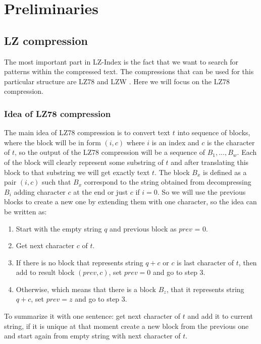 \section{Preliminaries}
\subsection{LZ compression}
\label{subsection:LZCompression}
The most important part in LZ-Index \cite{LZIndex} is the fact that we want to search for patterns within the compressed text. The compressions that can be used for this particular structure are LZ78 \cite{LZ78} and LZW \cite{LZW}. Here we will focus on the LZ78 compression. 

\subsubsection{Idea of LZ78 compression}

The main idea of LZ78 compression is to convert text $t$ into sequence of blocks, where the block will be in form $(i, c)$ where $i$ is an index and $c$ is the character of $t$, so the output of the LZ78 compression will be a sequence of $B_1,...,B_w$. Each of the block will clearly represent some substring of $t$ and after translating this block to that substring we will get exactly text $t$. The  block $B_x$ is defined as a pair $(i, c)$ such that $B_x$ correspond to the string obtained from decompressing $B_i$ adding character $c$ at the end or just $c$ if $i = 0$. So we will use the previous blocks to create a new one by extending them with one character, so the idea can be written as:

\begin{enumerate}
    \item Start with the empty string $q$ and previous block as $prev$ = 0.
    \item Get next character $c$ of $t$.
    \item If there is no block that represents string $q + c$ or $c$ is last character of $t$, then add to result block $(prev, c)$, set $prev = 0$ and go to step 3.
    \item Otherwise, which means that there is a block $B_z$, that it represents string $q + c$, set $prev = z$ and go to step 3.
\end{enumerate}

To summarize it with one sentence: get next character of $t$ and add it to current string, if it is unique at that moment create a new block from the previous one and start again from empty string with next character of $t$.

